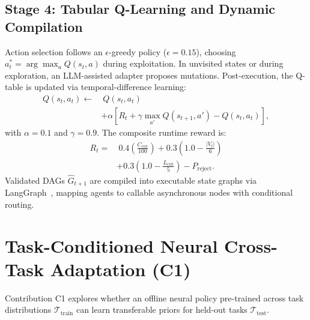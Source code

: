 \documentclass[conference]{IEEEtran}
\begin{document}
\subsection{Stage 4: Tabular Q-Learning and Dynamic Compilation}
Action selection follows an $\epsilon$-greedy policy ($\epsilon=0.15$), choosing $a_t^* = \arg\max_a Q(s_t, a)$ during exploitation. In unvisited states or during exploration, an LLM-assisted adapter proposes mutations. Post-execution, the Q-table is updated via temporal-difference learning:
\begin{equation}
\begin{aligned}
Q(s_t, a_t) \leftarrow & \ Q(s_t, a_t) \\
& + \alpha \left[ R_t + \gamma \max_{a'} Q(s_{t+1}, a') - Q(s_t, a_t) \right],
\end{aligned}
\end{equation}
with $\alpha = 0.1$ and $\gamma = 0.9$. The composite runtime reward is:
\begin{equation}
\begin{aligned}
R_t = & \ 0.4 \left(\frac{C_{\mathrm{cov}}}{100}\right) + 0.3 \left(1.0 - \frac{|V_t|}{6}\right) \\
& + 0.3 \left(1.0 - \frac{L_{\mathrm{crit}}}{5}\right) - P_{\mathrm{reject}}.
\end{aligned}
\label{eq:reward}
\end{equation}
Validated DAGs $\widehat{G}_{t+1}$ are compiled into executable state graphs via LangGraph~\cite{langgraph2024}, mapping agents to callable asynchronous nodes with conditional routing.



\section{Task-Conditioned Neural Cross-Task Adaptation (C1)}
\label{sec:neural_adaptation}

Contribution C1 explores whether an offline neural policy pre-trained across task distributions $\mathcal{T}_{\mathrm{train}}$ can learn transferable priors for held-out tasks $\mathcal{T}_{\mathrm{test}}$.
\end{document}
